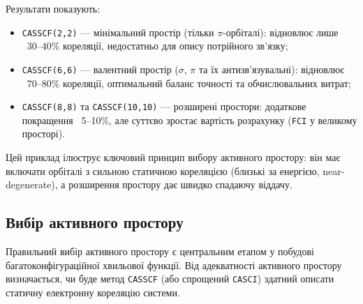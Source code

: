 Результати показують:
\begin{itemize}
\item \texttt{CASSCF(2,2)} --- мінімальний простір (тільки $\pi$-орбіталі):
  відновлює лише ~30--40\% кореляції, недостатньо для опису
  потрійного зв'язку;

\item \texttt{CASSCF(6,6)} --- валентний простір ($\sigma$, $\pi$ та їх
  антизв'язувальні): відновлює ~70--80\% кореляції, оптимальний
  баланс точності та обчислювальних витрат;

\item \texttt{CASSCF(8,8)} та \texttt{CASSCF(10,10)} --- розширені простори:
  додаткове покращення ~5--10\%, але суттєво зростає вартість
  розрахунку (\texttt{FCI} у великому просторі).
\end{itemize}

Цей приклад ілюструє ключовий принцип вибору активного простору:
він має включати орбіталі з сильною статичною кореляцією
(близькі за енергією, near-degenerate), а розширення простору
дає швидко спадаючу віддачу.


\subsection{Вибір активного простору}

Правильний вибір активного простору є центральним етапом у побудові
багатоконфігураційної хвильової функції. Від адекватності активного простору
визначається, чи буде метод \texttt{CASSCF} (або спрощений \texttt{CASCI})
здатний описати статичну електронну кореляцію системи.

